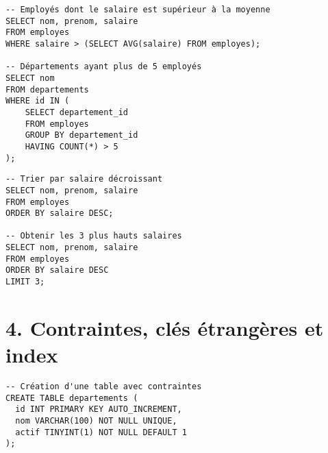 \documentclass[a4paper,11pt]{article}
\begin{document}
\begin{tcolorbox}[colback=orange!5!white,colframe=orange!75!black,title=Sous-requêtes (Subqueries)]
\begin{verbatim}
-- Employés dont le salaire est supérieur à la moyenne
SELECT nom, prenom, salaire
FROM employes
WHERE salaire > (SELECT AVG(salaire) FROM employes);

-- Départements ayant plus de 5 employés
SELECT nom
FROM departements
WHERE id IN (
    SELECT departement_id
    FROM employes
    GROUP BY departement_id
    HAVING COUNT(*) > 5
);
\end{verbatim}
\end{tcolorbox}

\begin{tcolorbox}[colback=red!5!white,colframe=red!75!black,title=Tri et limitation (ORDER BY / LIMIT)]
\begin{verbatim}
-- Trier par salaire décroissant
SELECT nom, prenom, salaire
FROM employes
ORDER BY salaire DESC;

-- Obtenir les 3 plus hauts salaires
SELECT nom, prenom, salaire
FROM employes
ORDER BY salaire DESC
LIMIT 3;
\end{verbatim}
\end{tcolorbox}


\section*{4. Contraintes, clés étrangères et index}

\begin{tcolorbox}[colback=blue!5!white,colframe=blue!75!black,title=Contraintes de base (PRIMARY KEY | NOT NULL | UNIQUE | DEFAULT)]
\begin{verbatim}
-- Création d'une table avec contraintes
CREATE TABLE departements (
  id INT PRIMARY KEY AUTO_INCREMENT,
  nom VARCHAR(100) NOT NULL UNIQUE,
  actif TINYINT(1) NOT NULL DEFAULT 1
);
\end{verbatim}
\end{tcolorbox}
\end{document}
